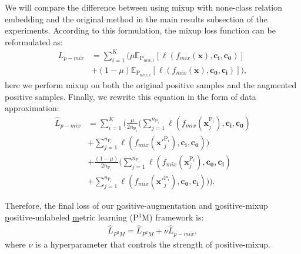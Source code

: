 \documentclass[letterpaper]{article}
\begin{document}
We will compare the difference between using mixup with none-class relation embedding and the original method in the main results subsection of the experiments.
According to this formulation, the mixup loss function can be reformulated as:
\begin{equation}
\begin{aligned}\label{eq12}
L_{p-mix} &= \sum_{i=1}^{K} (\mu \mathbb{E}_{\mathrm{P}_{new,i}}[ \ell(f_{mix}(\boldsymbol{x}), \boldsymbol{c_{i}}, \boldsymbol{c_{0}})] \\&+ (1-\mu) \mathbb{E}_{\mathrm{P}_{new,i}}[ \ell(f_{mix}(\boldsymbol{x}), \boldsymbol{c_{0}}, \boldsymbol{c_{i}})]),
\end{aligned}
\end{equation}
here we perform mixup on both the original positive samples and the augmented positive samples. Finally, we rewrite this equation in the form of data approximation:
\begin{equation}
\begin{aligned}\label{eq13}
\widehat{L}_{p-mix} &= \sum_{i=1}^{K} (\frac{\mu}{2n_{\mathrm{P}_{i}}} (\sum_{j=1}^{n_{\mathrm{P}_{i}}}\ell(f_{mix}(\boldsymbol{x}_{j}^{\mathrm{P}_{i}}), \boldsymbol{c_{i}}, \boldsymbol{c_{0}}) \\&+ \sum_{j=1}^{n_{\mathrm{P}_{i}}} \ell(f_{mix}(\boldsymbol{x'}_{j}^{\mathrm{P}_{i}}), \boldsymbol{c_{i}}, \boldsymbol{c_{0}})) \\&+ \frac{(1-\mu)}{2n_{\mathrm{P}_{i}}} (\sum_{j=1}^{n_{\mathrm{P}_{i}}}\ell(f_{mix}(\boldsymbol{x}_{j}^{\mathrm{P}_{i}}), \boldsymbol{c_{0}}, \boldsymbol{c_{i}}) \\&+ \sum_{j=1}^{n_{\mathrm{P}_{i}}} \ell(f_{mix}(\boldsymbol{x'}_{j}^{\mathrm{P}_{i}}), \boldsymbol{c_{0}}, \boldsymbol{c_{i}}))).
\end{aligned}
\end{equation}

Therefore, the final loss of our \underline{p}ositive-augmentation and \underline{p}ositive-mixup \underline{p}ositive-unlabeled \underline{m}etric learning (P$^{3}$M) framework is:
\begin{equation}
\begin{aligned}\label{eq14}
\widehat{L}_{P^{3}M} = \widehat{L}_{P^{2}M} + \nu \widehat{L}_{p-mix},
\end{aligned}
\end{equation}
where $\nu$ is a hyperparameter that controls the strength of positive-mixup.
\end{document}
